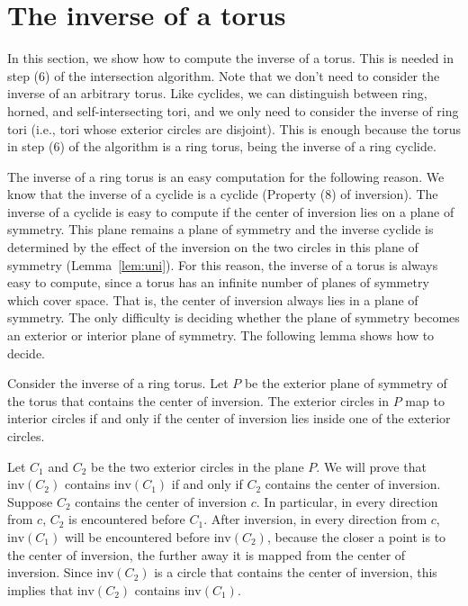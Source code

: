 
% 

\section{The inverse of a torus}
\label{sec:inv-cyclide}

In this section, we show how to compute the inverse of a torus.
This is needed in step (6) of the intersection algorithm.
Note that we don't need to consider the inverse of an arbitrary torus.
Like cyclides, we can distinguish between ring, horned, and self-intersecting
tori, and we only need to consider the inverse of ring tori 
(i.e., tori whose exterior circles are disjoint).
This is enough because 
the torus in step (6) of the algorithm is a ring torus,
being the inverse of a ring cyclide.

The inverse of a ring torus is an easy computation for the following reason.
We know that the inverse of a cyclide is a cyclide (Property (8) of inversion).
The inverse of a cyclide is easy to compute if the center of inversion
lies on a plane of symmetry.
This plane remains a plane of symmetry and the inverse cyclide is
determined by the effect of the inversion on the two circles in this plane
of symmetry (Lemma~\ref{lem:uni}).
For this reason, the inverse of a torus is always easy to compute,
since a torus has an infinite number of planes of symmetry which cover space.
That is, the center of inversion always lies in a plane of symmetry.
The only difficulty is deciding whether the plane of symmetry becomes 
an exterior or interior plane of symmetry.
The following lemma shows how to decide.

\begin{lemma}
\label{lem:intorext}
Consider the inverse of a ring torus.
Let $P$ be the exterior plane of symmetry of the torus that contains
the center of inversion.
The exterior circles in $P$ map to interior circles if and only if the
center of inversion lies inside one of the exterior circles.
\end{lemma}
\prf
Let $C_1$ and $C_2$ be the two exterior circles in the plane $P$.
We will prove that $\mbox{inv}(C_2)$ contains $\mbox{inv}(C_1)$ 
if and only if $C_2$ contains the center of inversion.
Suppose $C_2$ contains the center of inversion $c$.
In particular, in every direction from $c$, $C_2$ is encountered before $C_1$.
After inversion, in every direction from $c$,
$\mbox{inv}(C_1)$ will be encountered before $\mbox{inv}(C_2)$,
because the closer a point is to the center of inversion, 
the further away it is mapped from the center of inversion.
Since $\mbox{inv}(C_2)$ is a circle that contains the center of inversion,
this implies that $\mbox{inv}(C_2)$ contains $\mbox{inv}(C_1)$.

